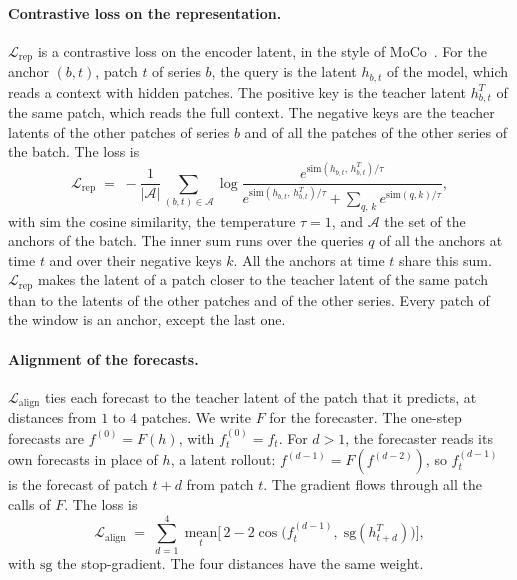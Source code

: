 \paragraph{Contrastive loss on the representation.}
$\mathcal{L}_{\mathrm{rep}}$ is a contrastive loss on the encoder
latent, in the style of MoCo~\citep{he2020moco}. For the anchor
$(b, t)$, patch $t$ of series $b$, the query is the latent $h_{b,t}$
of the model, which reads a context with hidden patches. The positive
key is the teacher latent $h^T_{b,t}$ of the same patch, which reads
the full context. The negative keys are the teacher latents of the
other patches of series $b$ and of all the patches of the other series
of the batch. The loss is
\begin{equation*}
  \mathcal{L}_{\mathrm{rep}} \;=\; -\frac{1}{|\mathcal{A}|}
  \sum_{(b,t) \in \mathcal{A}}
  \log \frac{e^{\mathrm{sim}(h_{b,t},\, h^T_{b,t}) / \tau}}
  {e^{\mathrm{sim}(h_{b,t},\, h^T_{b,t}) / \tau}
   + \sum_{q,\,k} e^{\mathrm{sim}(q, k) / \tau}},
\end{equation*}
with $\mathrm{sim}$ the cosine similarity, the temperature $\tau = 1$,
and $\mathcal{A}$ the set of the anchors of the batch. The inner
sum runs over the queries $q$ of all the anchors at time $t$ and over
their negative keys $k$. All the anchors at time $t$ share this sum.
$\mathcal{L}_{\mathrm{rep}}$ makes the latent of a patch closer to the
teacher latent of the same patch than to the latents of the other
patches and of the other series. Every patch of the window is an
anchor, except the last one.

\paragraph{Alignment of the forecasts.}
$\mathcal{L}_{\mathrm{align}}$ ties each forecast to the teacher latent
of the patch that it predicts, at distances from $1$ to $4$ patches.
We write $F$ for the forecaster. The one-step forecasts are
$f^{(0)} = F(h)$, with $f^{(0)}_t = f_t$. For $d > 1$, the forecaster
reads its own forecasts in place of $h$, a latent rollout: $f^{(d-1)} = F(f^{(d-2)})$,
so $f^{(d-1)}_t$ is the forecast of patch $t + d$ from patch $t$. The
gradient flows through all the calls of $F$. The loss is
\begin{equation*}
  \mathcal{L}_{\mathrm{align}} \;=\; \sum_{d=1}^{4}\;
  \underset{t}{\mathrm{mean}}
  \Big[\, 2 - 2 \cos\!\big(f^{(d-1)}_t,\; \mathrm{sg}(h^T_{t+d})\big) \Big],
\end{equation*}
with $\mathrm{sg}$ the stop-gradient. The four distances have the same
weight.


